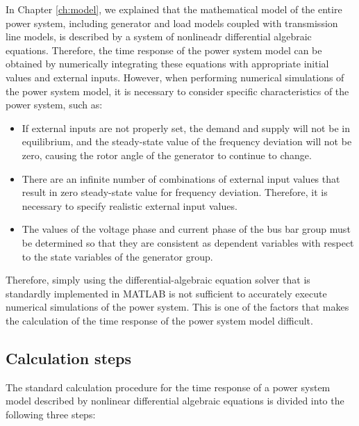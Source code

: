 \documentclass[graybox, envcountchap]{svmult}
\begin{document}
In Chapter \ref{ch:model}, we explained that the mathematical model of the
entire power system, including generator and load models coupled with
transmission line models, is described by a system of nonlineadr differential
algebraic equations. Therefore, the time response of the power system model can
be obtained by numerically integrating these equations with appropriate initial
values and external inputs. However, when performing numerical simulations of
the power system model, it is necessary to consider specific characteristics of
the power system, such as:
\begin{itemize}
  \item If external inputs are not properly set, the demand and supply will not
  be in equilibrium, and the steady-state value of the frequency deviation will
  not be zero, causing the rotor angle of the generator to continue to change.
  \item There are an infinite number of combinations of external input values
  that result in zero steady-state value for frequency deviation. Therefore, it
  is necessary to specify realistic external input values.
  \item The values of the voltage phase and current phase of the bus bar group
  must be determined so that they are consistent as dependent variables with
  respect to the state variables of the generator group.
\end{itemize}

Therefore, simply using the differential-algebraic equation solver that is
standardly implemented in MATLAB is not sufficient to accurately execute
numerical simulations of the power system. This is one of the factors that makes
the calculation of the time response of the power system model difficult.

\subsection{Calculation steps}\label{sec:numstep}

The standard calculation procedure for the time response of a power system model
described by nonlinear differential algebraic equations is divided into the
following three steps:
\end{document}
